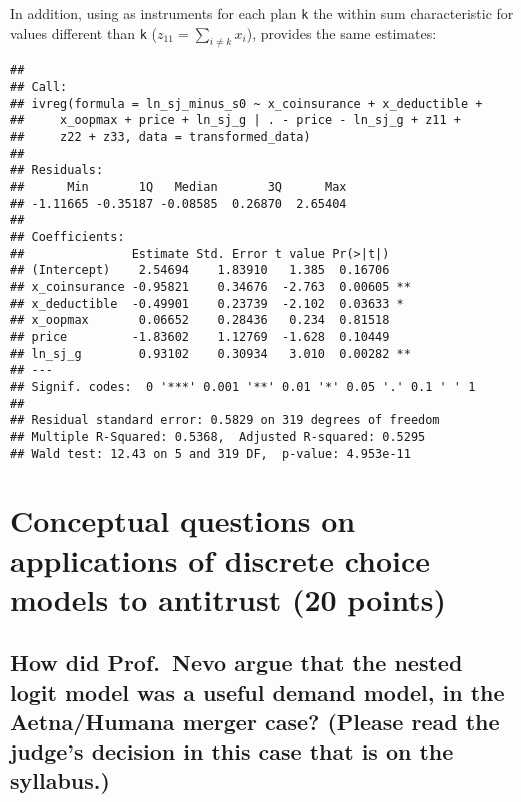 \documentclass[]{article}
\begin{document}
In addition, using as instruments for each plan \texttt{k} the within
sum characteristic for values different than \texttt{k}
(\(z_{11} = \sum_{i \neq k } x_{i}\)), provides the same estimates:

\begin{verbatim}
## 
## Call:
## ivreg(formula = ln_sj_minus_s0 ~ x_coinsurance + x_deductible + 
##     x_oopmax + price + ln_sj_g | . - price - ln_sj_g + z11 + 
##     z22 + z33, data = transformed_data)
## 
## Residuals:
##      Min       1Q   Median       3Q      Max 
## -1.11665 -0.35187 -0.08585  0.26870  2.65404 
## 
## Coefficients:
##               Estimate Std. Error t value Pr(>|t|)   
## (Intercept)    2.54694    1.83910   1.385  0.16706   
## x_coinsurance -0.95821    0.34676  -2.763  0.00605 **
## x_deductible  -0.49901    0.23739  -2.102  0.03633 * 
## x_oopmax       0.06652    0.28436   0.234  0.81518   
## price         -1.83602    1.12769  -1.628  0.10449   
## ln_sj_g        0.93102    0.30934   3.010  0.00282 **
## ---
## Signif. codes:  0 '***' 0.001 '**' 0.01 '*' 0.05 '.' 0.1 ' ' 1
## 
## Residual standard error: 0.5829 on 319 degrees of freedom
## Multiple R-Squared: 0.5368,  Adjusted R-squared: 0.5295 
## Wald test: 12.43 on 5 and 319 DF,  p-value: 4.953e-11
\end{verbatim}

\hypertarget{conceptual-questions-on-applications-of-discrete-choice-models-to-antitrust-20-points}{%
\section{Conceptual questions on applications of discrete choice models
to antitrust (20
points)}\label{conceptual-questions-on-applications-of-discrete-choice-models-to-antitrust-20-points}}

\hypertarget{how-did-prof.-nevo-argue-that-the-nested-logit-model-was-a-useful-demand-model-in-the-aetnahumana-merger-case-please-read-the-judges-decision-in-this-case-that-is-on-the-syllabus.}{%
\subsection{How did Prof.~Nevo argue that the nested logit model was a
useful demand model, in the Aetna/Humana merger case? (Please read the
judge's decision in this case that is on the
syllabus.)}\label{how-did-prof.-nevo-argue-that-the-nested-logit-model-was-a-useful-demand-model-in-the-aetnahumana-merger-case-please-read-the-judges-decision-in-this-case-that-is-on-the-syllabus.}}
\end{document}
